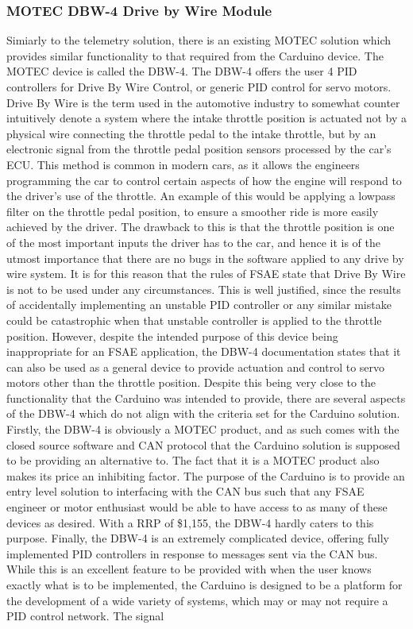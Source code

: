 \subsubsection{MOTEC DBW-4 Drive by Wire Module}
Simiarly to the telemetry solution, there is an existing MOTEC solution which provides similar functionality to that required from the Carduino device. The MOTEC device is called the DBW-4. The DBW-4 offers the user 4 PID controllers for Drive By Wire Control, or generic PID control for servo motors\cite{DBW4_manual}\cite{MOTEC_prices}. Drive By Wire is the term used in the automotive industry to somewhat counter intuitively denote a system where the intake throttle position is actuated not by a physical wire connecting the throttle pedal to the intake throttle, but by an electronic signal from the throttle pedal position sensors processed by the car's ECU\cite{pruckner2012drive}. This method is common in modern cars, as it allows the engineers programming the car to control certain aspects of how the engine will respond to the driver's use of the throttle\cite{DBW}. An example of this would be applying a lowpass filter on the throttle pedal position, to ensure a smoother ride is more easily achieved by the driver. The drawback to this is that the throttle position is one of the most important inputs the driver has to the car, and hence it is of the utmost importance that there are no bugs in the software applied to any drive by wire system. It is for this reason that the rules of FSAE state that Drive By Wire is not to be used under any circumstances\cite{FSAE_inspection}\cite{FSAE_rules}. This is well justified, since the results of accidentally implementing an unstable PID controller or any similar mistake could be catastrophic when that unstable controller is applied to the throttle position. However, despite the intended purpose of this device being inappropriate for an FSAE application, the DBW-4 documentation states that it can also be used as a general device to provide actuation and control to servo motors other than the throttle position\cite{DBW4_manual}. Despite this being very close to the functionality that the Carduino was intended to provide, there are several aspects of the DBW-4 which do not align with the criteria set for the Carduino solution. Firstly, the DBW-4 is obviously a MOTEC product, and as such comes with the closed source software and CAN protocol that the Carduino solution is supposed to be providing an alternative to. The fact that it is a MOTEC product also makes its price an inhibiting factor. The purpose of the Carduino is to provide an entry level solution to interfacing with the CAN bus such that any FSAE engineer or motor enthusiast would be able to have access to as many of these devices as desired. With a RRP of \$1,155\cite{MOTEC_prices}, the DBW-4 hardly caters to this purpose. Finally, the DBW-4 is an extremely complicated device, offering fully implemented PID controllers in response to messages sent via the CAN bus. While this is an excellent feature to be provided with when the user knows exactly what is to be implemented, the Carduino is designed to be a platform for the development of a wide variety of systems, which may or may not require a PID control network. The signal 